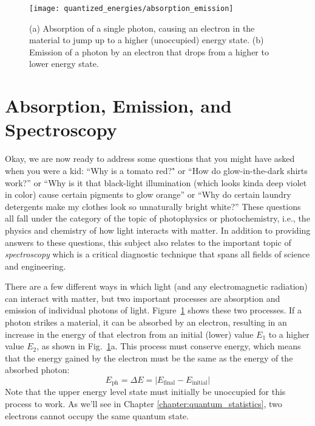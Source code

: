 \begin{figure}[!t]
\begin{center}
\texttt{[image: quantized\_energies/absorption\_emission]}
\end{center}
\caption{(a) Absorption of a single photon, causing an electron in
the material to jump up to a higher (unoccupied) energy state. (b) Emission
of a photon by an electron that drops from a higher to lower energy
state.}
\label{fig:absorption_emission}
\end{figure}

\section{Absorption, Emission, and Spectroscopy}
\label{sec:absorption_emission}

Okay, we are now ready to address some questions that you might have asked
when you were a kid: ``Why is a tomato red?" or ``How do glow-in-the-dark
shirts work?'' or ``Why is it that black-light illumination (which looks
kinda deep violet in color) cause certain pigments to glow orange'' or
``Why do certain laundry detergents make my clothes look so unnaturally
bright white?'' These questions all fall under the category of the topic
of photophysics or photochemistry, i.e., the physics and chemistry of
how light interacts with matter. In addition to providing answers to
these questions, this subject also relates to the important topic of
{\it spectroscopy} which is a critical diagnostic technique that spans
all fields of science and engineering.

There are a few different ways in which light (and any
electromagnetic radiation) can interact with matter, but two important
processes are absorption and emission of individual photons of
light. Figure~\ref{fig:absorption_emission} shows these two processes.
If a photon strikes a material, it can be absorbed by an electron,
resulting in an increase in the energy of that electron from an
initial (lower) value $E_1$ to a higher value $E_2$, as shown in
Fig.~\ref{fig:absorption_emission}a. This process must conserve energy,
which means that the energy gained by the electron must be the same as
the energy of the absorbed photon:
\begin{equation}
\label{eq:photon_energy}
E_\text{ph} = \Delta E = |E_\text{final} - E_\text{initial}|
\end{equation} 
Note that the upper energy level state must initially be unoccupied for
this process to work. As we'll see in Chapter \ref{chapter:quantum_statistics},
two electrons cannot occupy the same quantum state.

